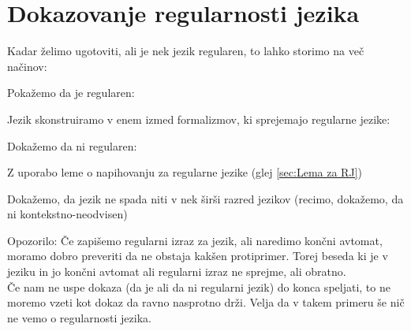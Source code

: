 \documentclass[10pt,a4paper,oneside]{book}
\begin{document}
\section{Dokazovanje regularnosti jezika}
Kadar želimo ugotoviti, ali je nek jezik regularen, to lahko storimo na več načinov:
\begin{items}
\item Pokažemo da je regularen:
	\begin{items}
	\item Jezik skonstruiramo v enem izmed formalizmov, ki sprejemajo regularne jezike:
		\begin{items}
		\item {}
		\item {}
		\item {}
		\end{items}
	\end{items}
\item Dokažemo da ni regularen:
	\begin{items}
	\item Z uporabo leme o napihovanju za regularne jezike (glej \ref{sec:Lema za RJ})
	\item Dokažemo, da jezik ne spada niti v nek širši razred jezikov (recimo, dokažemo, da ni kontekstno-neodvisen)
	\end{items}
\end{items}
Opozorilo: Če zapišemo regularni izraz za jezik, ali naredimo končni avtomat, moramo dobro preveriti da ne obstaja kakšen protiprimer. Torej beseda ki je v jeziku in jo končni avtomat ali regularni izraz ne sprejme, ali obratno.\\
Če nam ne uspe dokaza (da je ali da ni regularni jezik) do konca speljati, to ne moremo vzeti kot dokaz da ravno nasprotno drži. Velja da v takem primeru še nič ne vemo o regularnosti jezika.
\end{document}
